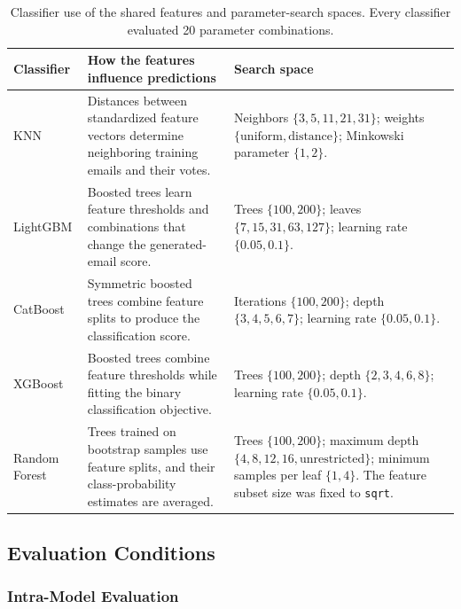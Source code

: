 \documentclass[conference]{IEEEtran}
\begin{document}
\begin{table}[!tp]
\centering
\small
\caption{Classifier use of the shared features and parameter-search
spaces. Every classifier evaluated 20 parameter combinations.}
\label{tab:classifier-settings}
\renewcommand{\arraystretch}{1.15}
\begin{tabularx}{\textwidth}{
    @{}L{0.13\textwidth}L{0.33\textwidth}Y@{}
}
\toprule
Classifier & How the features influence predictions & Search space \\
\midrule

KNN
&
Distances between standardized feature vectors determine neighboring
training emails and their votes.
&
Neighbors $\{3,5,11,21,31\}$; weights
$\{\text{uniform},\text{distance}\}$; Minkowski parameter
$\{1,2\}$.
\\

LightGBM
&
Boosted trees learn feature thresholds and combinations that
change the generated-email score.
&
Trees $\{100,200\}$; leaves $\{7,15,31,63,127\}$;
learning rate $\{0.05,0.1\}$.
\\

CatBoost
&
Symmetric boosted trees combine feature splits to produce
the classification score.
&
Iterations $\{100,200\}$; depth $\{3,4,5,6,7\}$;
learning rate $\{0.05,0.1\}$.
\\

XGBoost
&
Boosted trees combine feature thresholds while fitting the
binary classification objective.
&
Trees $\{100,200\}$; depth $\{2,3,4,6,8\}$;
learning rate $\{0.05,0.1\}$.
\\

Random Forest
&
Trees trained on bootstrap samples use feature splits,
and their class-probability estimates are averaged.
&
Trees $\{100,200\}$; maximum depth
$\{4,8,12,16,\text{unrestricted}\}$; minimum samples per
leaf $\{1,4\}$. The feature subset size was fixed to
\texttt{sqrt}.
\\

\bottomrule
\end{tabularx}
\end{table}

\subsection{Evaluation Conditions}

\subsubsection{Intra-Model Evaluation}
\end{document}
